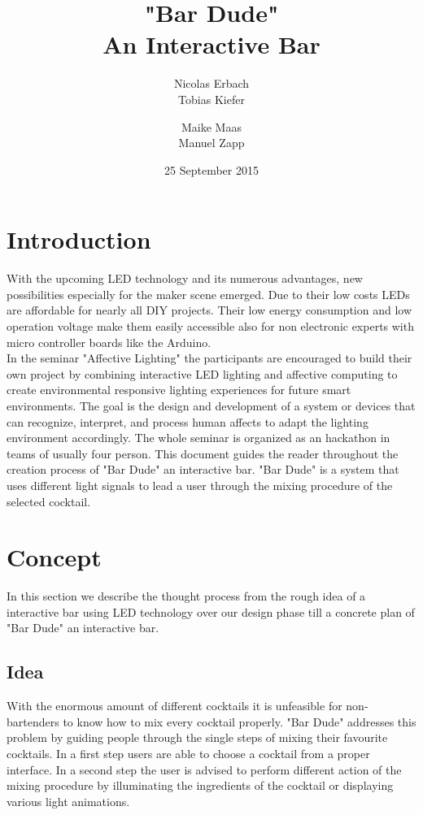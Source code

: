 \documentclass{acm_proc_article-sp}
\begin{document}
\title{"Bar Dude" \\ An Interactive Bar}

\author{
\alignauthor
Nicolas Erbach\\
\alignauthor
Tobias Kiefer\\
\and
\alignauthor Maike Maas\\
\alignauthor Manuel Zapp\\
}
\date{25 September 2015}

\maketitle

\section{Introduction}
With the upcoming LED technology and its numerous advantages, new possibilities especially for the maker scene emerged. Due to their low costs LEDs are affordable for nearly all DIY projects. Their low energy consumption and low operation voltage make them easily accessible also for non electronic experts with micro controller boards like the Arduino.\\
In the seminar "Affective Lighting" the participants are encouraged to build their own project by combining interactive LED lighting and affective computing to create environmental responsive lighting experiences for future smart environments. The goal is the design and development of a system or devices that can recognize, interpret, and process human affects to adapt the lighting environment accordingly. The whole seminar is organized as an hackathon in teams of usually four person. This document guides the reader throughout the creation process of "Bar Dude" an interactive bar. "Bar Dude" is a system that uses different light signals to lead a user through the mixing procedure of the selected cocktail.

\section{Concept}
In this section we describe the thought process from the rough idea of a interactive bar using LED technology over our design phase till a concrete plan of "Bar Dude" an interactive bar.
\subsection{Idea}
With the enormous amount of different cocktails it is unfeasible for non-bartenders to know how to mix every cocktail properly. "Bar Dude" addresses this problem by guiding people through the single steps of mixing their favourite cocktails. In a first step users are able to choose a cocktail from a proper interface. In a second step the user is advised to perform different action of the mixing procedure by illuminating the ingredients of the cocktail or displaying various light animations.
\end{document}
